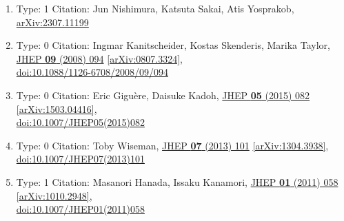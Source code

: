 \documentclass[a4paper,10pt]{article}
\begin{document}
\begin{enumerate}
\begin{enumerate}
  \item Type: 1 Citation: Jun Nishimura, Katsuta Sakai, Atis Yosprakob, \href{https://arxiv.org/abs/2307.11199}{arXiv:2307.11199}
  \item Type: 0 Citation: Ingmar Kanitscheider, Kostas Skenderis, Marika Taylor, \href{https://www.doi.org/10.1088/1126-6708/2008/09/094}{JHEP {\bf 09} (2008) 094}  \href{https://arxiv.org/abs/0807.3324}{[arXiv:0807.3324]},\\\href{https://www.doi.org/10.1088/1126-6708/2008/09/094}{doi:10.1088/1126-6708/2008/09/094}
  \item Type: 0 Citation: Eric Giguère, Daisuke Kadoh, \href{https://www.doi.org/10.1007/JHEP05(2015)082}{JHEP {\bf 05} (2015) 082}  \href{https://arxiv.org/abs/1503.04416}{[arXiv:1503.04416]},\\\href{https://www.doi.org/10.1007/JHEP05(2015)082}{doi:10.1007/JHEP05(2015)082}
  \item Type: 0 Citation: Toby Wiseman, \href{https://www.doi.org/10.1007/JHEP07(2013)101}{JHEP {\bf 07} (2013) 101}  \href{https://arxiv.org/abs/1304.3938}{[arXiv:1304.3938]},\\\href{https://www.doi.org/10.1007/JHEP07(2013)101}{doi:10.1007/JHEP07(2013)101}
  \item Type: 1 Citation: Masanori Hanada, Issaku Kanamori, \href{https://www.doi.org/10.1007/JHEP01(2011)058}{JHEP {\bf 01} (2011) 058}  \href{https://arxiv.org/abs/1010.2948}{[arXiv:1010.2948]},\\\href{https://www.doi.org/10.1007/JHEP01(2011)058}{doi:10.1007/JHEP01(2011)058}

\end{enumerate}
\end{enumerate}
\end{document}
